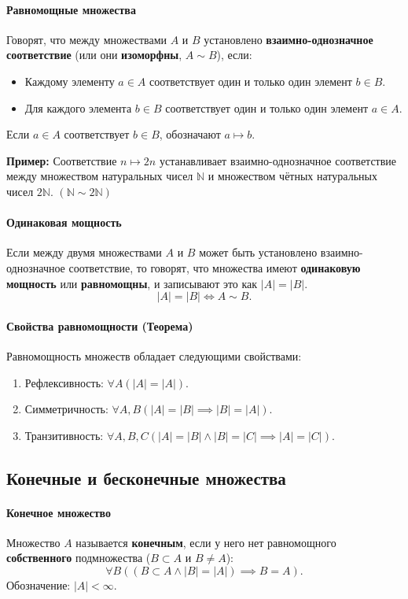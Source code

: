 \paragraph{Равномощные множества}
Говорят, что между множествами $A$ и $B$ установлено \textbf{взаимно-однозначное соответствие} (или они \textbf{изоморфны}, $A \sim B$), если:
\begin{itemize}
    \item Каждому элементу $a \in A$ соответствует один и только один элемент $b \in B$.
    \item Для каждого элемента $b \in B$ соответствует один и только один элемент $a \in A$.
\end{itemize}
Если $a \in A$ соответствует $b \in B$, обозначают $a \mapsto b$.

\textbf{Пример:} Соответствие $n \mapsto 2n$ устанавливает взаимно-однозначное соответствие между множеством натуральных чисел $\mathbb{N}$ и множеством чётных натуральных чисел $2\mathbb{N}$. $(\mathbb{N} \sim 2\mathbb{N})$

\paragraph{Одинаковая мощность}
Если между двумя множествами $A$ и $B$ может быть установлено взаимно-однозначное соответствие, то говорят, что множества имеют \textbf{одинаковую мощность} или \textbf{равномощны}, и записывают это как $|A| = |B|$.
$$|A| = |B| \iff A \sim B.$$

\paragraph{Свойства равномощности (Теорема)}
Равномощность множеств обладает следующими свойствами:
\begin{enumerate}
    \item Рефлексивность: $\forall A (|A| = |A|)$.
    \item Симметричность: $\forall A, B (|A| = |B| \implies |B| = |A|)$.
    \item Транзитивность: $\forall A, B, C (|A| = |B| \land |B| = |C| \implies |A| = |C|)$.
\end{enumerate}

\subsection*{Конечные и бесконечные множества}

\paragraph{Конечное множество}
Множество $A$ называется \textbf{конечным}, если у него нет равномощного \textbf{собственного} подмножества ($B \subset A$ и $B \ne A$):
$$\forall B ((B \subset A \land |B| = |A|) \implies B = A).$$
Обозначение: $|A| < \infty$.

